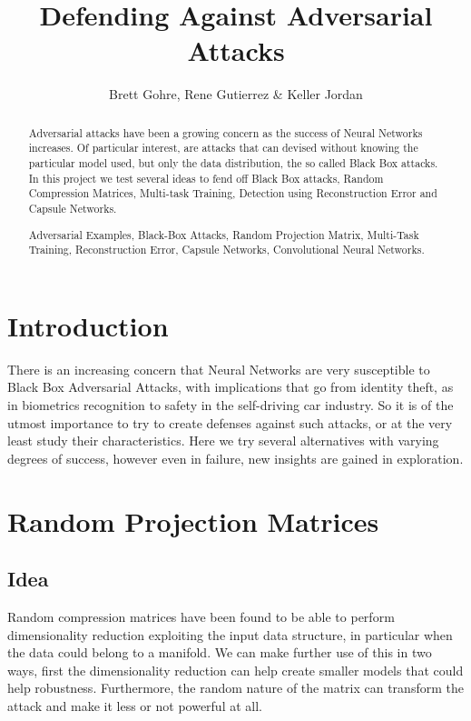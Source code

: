 \documentclass{asaproc}
\title{Defending Against Adversarial Attacks}
\author{Brett Gohre, Rene Gutierrez \& Keller Jordan \\ }
\begin{document}
\maketitle


\begin{abstract}
	
Adversarial attacks have been a growing concern as the success of Neural Networks increases. Of particular interest, are attacks that can devised without knowing the particular model used, but only the data distribution, the so called Black Box attacks. In this project we test several ideas to fend off Black Box attacks, Random Compression Matrices, Multi-task Training, Detection using Reconstruction Error and Capsule Networks.
	
\begin{keywords}
Adversarial Examples, Black-Box Attacks, Random Projection Matrix, Multi-Task Training, Reconstruction Error, Capsule Networks, Convolutional Neural Networks.
\end{keywords}
\end{abstract}


\section{Introduction}

There is an increasing concern that Neural Networks are very susceptible to Black Box Adversarial Attacks, with implications that go from identity theft, as in biometrics recognition to safety in the self-driving car industry. So it is of the utmost importance to try to create defenses against such attacks, or at the very least study their characteristics. Here we try several alternatives with varying degrees of success, however even in failure, new insights are gained in exploration.

\section{Random Projection Matrices}

\subsection*{Idea}

Random compression matrices have been found to be able to perform dimensionality reduction exploiting the input data structure, in particular when the data could belong to a manifold. We can make further use of this in two ways, first the dimensionality reduction can help create smaller models that could help robustness. Furthermore, the random nature of the matrix can transform the attack and make it less or not powerful at all.
\end{document}
